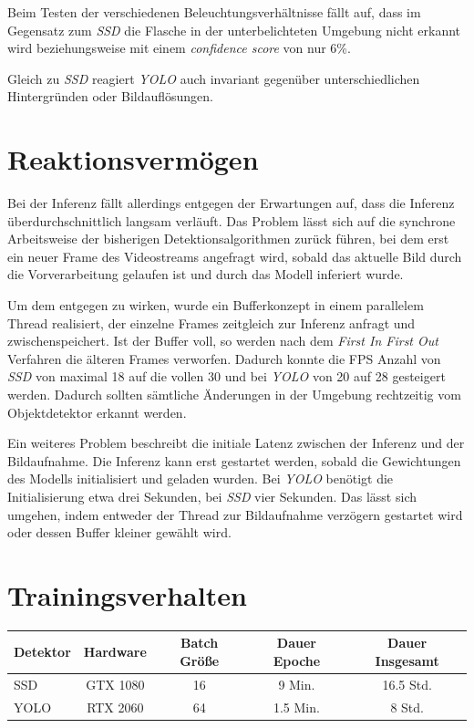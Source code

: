 Beim Testen der verschiedenen Beleuchtungsverhältnisse fällt auf, dass im Gegensatz zum \textit{SSD} die Flasche in der unterbelichteten Umgebung nicht erkannt wird beziehungsweise mit einem \textit{confidence score} von nur 6\%. 

Gleich zu \textit{SSD} reagiert \textit{YOLO} auch invariant gegenüber unterschiedlichen Hintergründen oder Bildauflösungen.
 
\section{Reaktionsvermögen}

Bei der Inferenz fällt allerdings entgegen der Erwartungen auf, dass die Inferenz überdurchschnittlich langsam verläuft. Das Problem lässt sich auf die synchrone Arbeitsweise der bisherigen Detektionsalgorithmen zurück führen, bei dem erst ein neuer Frame des Videostreams angefragt wird, sobald das aktuelle Bild durch die Vorverarbeitung gelaufen ist und durch das Modell inferiert wurde. 

Um dem entgegen zu wirken, wurde ein Bufferkonzept in einem parallelem Thread realisiert, der einzelne Frames zeitgleich zur Inferenz anfragt und zwischenspeichert. Ist der Buffer voll, so werden nach dem \textit{First In First Out} Verfahren die älteren Frames verworfen. Dadurch konnte die FPS Anzahl von \textit{SSD} von maximal 18 auf die vollen 30 und bei \textit{YOLO} von 20 auf 28 gesteigert werden. Dadurch sollten sämtliche Änderungen in der Umgebung rechtzeitig vom Objektdetektor erkannt werden. 

Ein weiteres Problem beschreibt die initiale Latenz zwischen der Inferenz und der Bildaufnahme. Die Inferenz kann erst gestartet werden, sobald die Gewichtungen des Modells initialisiert und geladen wurden. Bei \textit{YOLO} benötigt die Initialisierung etwa drei Sekunden, bei \textit{SSD} vier Sekunden. Das lässt sich umgehen, indem entweder der Thread zur Bildaufnahme verzögern gestartet wird oder dessen Buffer kleiner gewählt wird.

\section{Trainingsverhalten}

\begin{center}
	\begin{tabular}[H]{l|c|c|c|c}
		Detektor & Hardware & Batch Größe & Dauer Epoche & Dauer Insgesamt \\
		\hline
		SSD & GTX 1080 & 16 & 9 Min. & 16.5 Std. \\
		YOLO & RTX 2060 & 64 & 1.5 Min. & 8 Std.
	\end{tabular}
	\label{table:duration}
\end{center}

